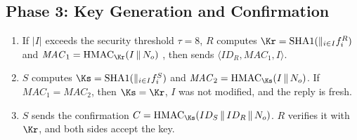 \subsection{Phase 3: Key Generation and Confirmation}
\begin{enumerate}
  \item If $|I|$ exceeds the security threshold $\tau = 8$, $R$ computes $\Kr = \mathrm{SHA1}(\Vert_{i\in I} f^R_i)$ and $\mathit{MAC}_1 = \mathrm{HMAC}_{\Kr}(I \,\Vert\, N_o)$ \cite{rfc2104}, then sends $\langle ID_R, \mathit{MAC}_1, I\rangle$.
  \item $S$ computes $\Ks = \mathrm{SHA1}(\Vert_{i\in I} f^S_i)$ and $\mathit{MAC}_2 = \mathrm{HMAC}_{\Ks}(I \,\Vert\, N_o)$. If $\mathit{MAC}_1 = \mathit{MAC}_2$, then $\Ks = \Kr$, $I$ was not modified, and the reply is fresh.
  \item $S$ sends the confirmation $C = \mathrm{HMAC}_{\Ks}(ID_S \,\Vert\, ID_R \,\Vert\, N_o)$. $R$ verifies it with $\Kr$, and both sides accept the key.
\end{enumerate}

